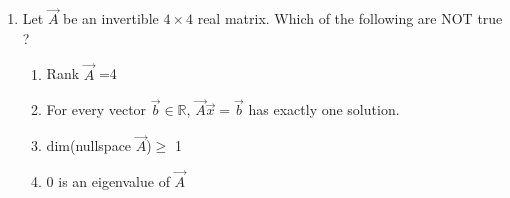 \renewcommand{\theequation}{\theenumi}
\renewcommand{\thefigure}{\theenumi}
\begin{enumerate}[label=\thesection.\arabic*.,ref=\thesection.\theenumi]

\item Let $\vec{A}$ be an invertible $4 \times 4$ real matrix. Which of the following are NOT true ? 
\begin{enumerate}
\item  Rank $\vec{A}$ =4
\item For every vector $\vec{b} \in \mathbb{R}$, $\vec{A}\vec{x}=\vec{b}$ has exactly one solution. 
\item dim(nullspace $\vec{A}$)$\geq$ 1
\item 0 is an eigenvalue of $\vec{A}$
\end{enumerate}

\solution


\end{enumerate}
